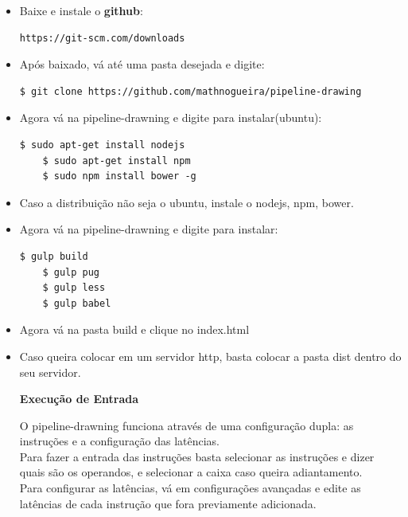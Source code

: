 \documentclass{article}
\begin{document}
	\begin{itemize}
	\item Baixe e instale o \textbf{github}: 
	\begin{lstlisting}[style=DOS]
	 https://git-scm.com/downloads
\end{lstlisting}
	\item Após baixado, vá até uma pasta desejada e digite:
	\begin{lstlisting}[style=DOS]
	$ git clone https://github.com/mathnogueira/pipeline-drawing
\end{lstlisting}
	\item Agora vá na pipeline-drawning e digite para instalar(ubuntu):
	\begin{lstlisting}[style=DOS]
	$ sudo apt-get install nodejs
	$ sudo apt-get install npm
	$ sudo npm install bower -g
\end{lstlisting}
	\item Caso a distribuição não seja o ubuntu, instale o nodejs, npm, bower.
	\item Agora vá na pipeline-drawning e digite para instalar:
	\begin{lstlisting}[style=DOS]
	$ gulp build
	$ gulp pug
	$ gulp less
	$ gulp babel
\end{lstlisting}
	\item Agora vá na pasta build e clique no index.html
	\item Caso queira colocar em um servidor http, basta colocar a pasta dist dentro do seu servidor.
	\clearpage
	\begin{center}
	\Large\textbf{Execução de Entrada}
	\end{center}
	O pipeline-drawning funciona através de uma configuração dupla: as instruções e a configuração das latências.\\
	Para fazer a entrada das instruções basta selecionar as instruções e dizer quais são os operandos, e selecionar a caixa caso queira adiantamento.\\
	Para configurar as latências, vá em configurações avançadas e edite as latências de cada instrução que fora previamente adicionada.
	
 \end{itemize}
\end{document}
